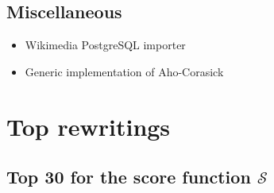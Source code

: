 \documentclass[a4paper, 11pt, onepage]{scrreprt}
\begin{document}
\section{Miscellaneous}
\label{sec:misc-software}
\begin{itemize}
\item Wikimedia PostgreSQL importer
\item Generic implementation of Aho-Corasick
\end{itemize}

\chapter{Top rewritings}

\section{Top 30 for the score function $\mathcal{S}$}
\end{document}

